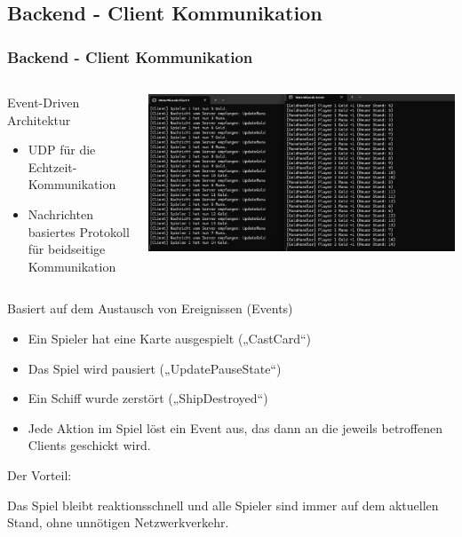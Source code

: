 \documentclass{beamer}
\begin{document}
\subsection{Backend - Client Kommunikation}
\begin{frame}
\frametitle{Backend - Client Kommunikation}
\begin{columns}
  \begin{column}{0.45\textwidth}
    Event-Driven Architektur
    \begin{itemize}
      \item UDP für die Echtzeit-Kommunikation
      \item Nachrichten basiertes Protokoll für beidseitige Kommunikation
    \end{itemize}
  \end{column}
  \begin{column}{0.55\textwidth}
    \includegraphics[width=\textwidth]{Server-Client-Logs.png}
  \end{column}
\end{columns}
\end{frame}
\begin{frame}[fragile]
  \begin{column}{0.85\textwidth}
    Basiert auf dem Austausch von Ereignissen (Events)
    \begin{itemize}
      \item Ein Spieler hat eine Karte ausgespielt („CastCard“)
      \item Das Spiel wird pausiert („UpdatePauseState“)
      \item Ein Schiff wurde zerstört („ShipDestroyed“)
      \item Jede Aktion im Spiel löst ein Event aus, das dann an die jeweils betroffenen Clients geschickt wird.
    \end{itemize}
      Der Vorteil: 
      \item
      Das Spiel bleibt reaktionsschnell und alle Spieler sind immer auf dem aktuellen Stand, ohne unnötigen Netzwerkverkehr.

\end{column}
\end{frame}
\end{document}

